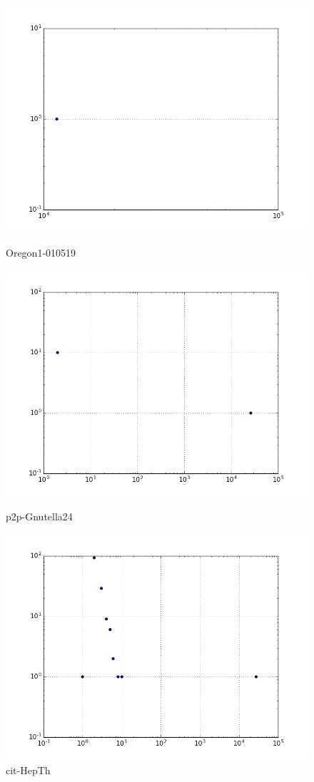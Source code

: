 \begin{figure}[H]
  \includegraphics[width=\linewidth]{img/oregon-010519/comp_dist.png}
  \caption*{Oregon1-010519}
\endminipage\hfill
{}
  \includegraphics[width=\linewidth]{img/p2p-Gnutella24/comp_dist.png}
  \caption*{p2p-Gnutella24}
\endminipage\hfill
{}
  \includegraphics[width=\linewidth]{img/cit-HepTh/comp_dist.png}
  \caption*{cit-HepTh}
\endminipage
\end{figure}

